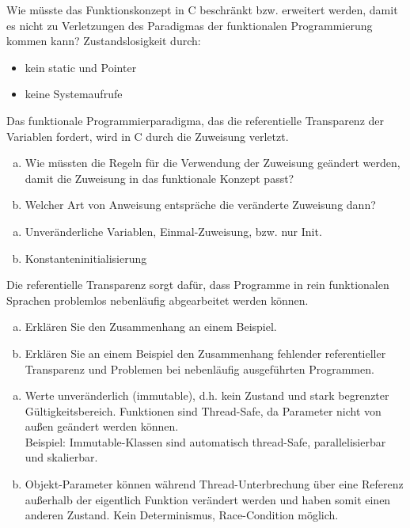 \begin{card}
	Wie müsste das Funktionskonzept in C beschränkt bzw. erweitert werden, damit es nicht zu Verletzungen des Paradigmas der funktionalen Programmierung kommen kann?
	\hr
	Zustandslosigkeit durch:
	\begin{itemize}
	\item kein static und Pointer 
	\item keine Systemaufrufe
	\end{itemize}
\end{card}

\begin{card}
	Das funktionale Programmierparadigma, das die referentielle Transparenz der Variablen fordert, wird in C durch die Zuweisung verletzt. 
	\begin{enumerate}[a)]
	\item Wie müssten die Regeln für die Verwendung der Zuweisung geändert werden, damit die	Zuweisung in das funktionale Konzept passt?
	\item Welcher Art von Anweisung entspräche die veränderte Zuweisung dann?
	\end{enumerate}
	\hr
	\begin{enumerate}[a)]
	\item Unveränderliche Variablen, Einmal-Zuweisung, bzw. nur Init.
	\item Konstanteninitialisierung
	\end{enumerate}
	
\end{card}

\begin{card}
	Die referentielle Transparenz sorgt dafür, dass Programme in rein funktionalen Sprachen	problemlos nebenläufig abgearbeitet werden können. 
	\begin{enumerate}[a)]
	\item Erklären Sie den Zusammenhang an einem Beispiel. 
	\item Erklären Sie an einem Beispiel den Zusammenhang fehlender referentieller Transparenz und Problemen bei nebenläufig ausgeführten Programmen. 
	\end{enumerate}
	\hr
	\begin{enumerate}[a)]
	\item Werte unveränderlich (immutable), d.h. kein Zustand und stark begrenzter Gültigkeitsbereich. Funktionen sind Thread-Safe, da Parameter nicht von außen geändert werden können.\\
	Beispiel: Immutable-Klassen sind automatisch thread-Safe, parallelisierbar und skalierbar. 
	\item Objekt-Parameter können während Thread-Unterbrechung über eine Referenz außerhalb der eigentlich Funktion verändert werden und haben somit einen anderen Zustand. Kein Determinismus, Race-Condition möglich.
	\end{enumerate}
\end{card}

